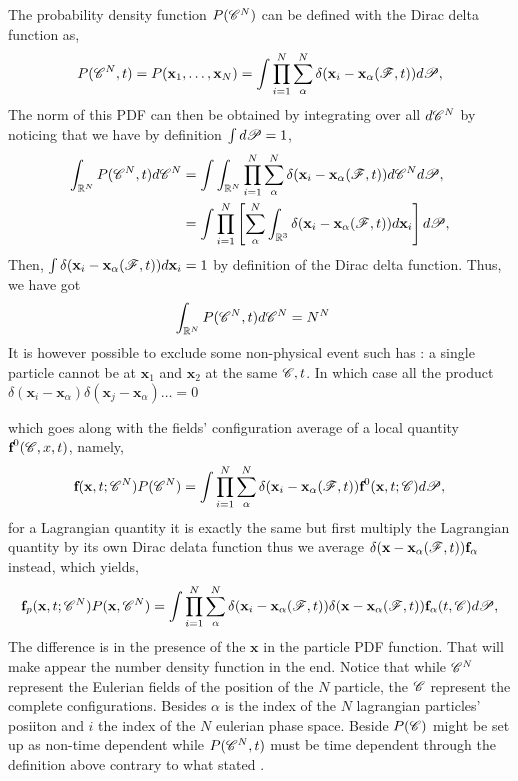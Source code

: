 The probability density function $P(\mathscr{C}^N)$ can be defined with the Dirac delta function as, 
\begin{equation*}
    P(\mathscr{C}^N,t)
    =
    P(\textbf{x}_1,\ldots,\textbf{x}_N)
    = \int 
    \prod_{i=1}^{N}\sum_{\alpha}^{N}\delta(\textbf{x}_i - \textbf{x}_\alpha(\mathscr{F},t))
    d\mathscr{P},
\end{equation*}
The norm of this PDF can then be obtained by integrating over all $d\mathscr{C}^N$ by noticing that we have by definition $\int d\mathscr{P} = 1$, 
\begin{align*}
    \int_{\mathbb{R}^N} P(\mathscr{C}^N,t) d\mathscr{C}^N
    &= 
    \int 
    \int_{\mathbb{R}^N}
    \prod_{i=1}^{N}
    \sum_{\alpha}^{N}
    \delta(\textbf{x}_i - \textbf{x}_\alpha(\mathscr{F},t))
    d\mathscr{C}^N
    d\mathscr{P},\\
    &= 
    \int 
    \prod_{i=1}^{N}\left[
    \sum_{\alpha}^{N}
    \int_{\mathbb{R}^3}
    \delta(\textbf{x}_i - \textbf{x}_\alpha(\mathscr{F},t))
    d\textbf{x}_i\right]
    d\mathscr{P},
\end{align*}
Then, $\int \delta(\textbf{x}_i - \textbf{x}_\alpha(\mathscr{F},t)) d\textbf{x}_i= 1$ by definition of the Dirac delta function. 
Thus, we have got 
\begin{align*}
    \int_{\mathbb{R}^N} P(\mathscr{C}^N,t) d\mathscr{C}^N
    &= 
    N^N
\end{align*}
It is however possible to exclude some non-physical event such has : a single particle cannot be at $\textbf{x}_1$ and $\textbf{x}_2$ at the same $\mathscr{C},t$. 
In which case all the product $\delta(\textbf{x}_i - \textbf{x}_\alpha)\delta(\textbf{x}_j - \textbf{x}_\alpha)\ldots  = 0$

which goes along with the fields' configuration average of a local quantity $\textbf{f}^0(\mathscr{C},x,t)$, namely, 
\begin{equation*}
    \textbf{f}(\textbf{x},t;\mathscr{C}^N) P(\mathscr{C}^N)
    = \int 
    \prod_{i=1}^{N}\sum_{\alpha}^{N}\delta(\textbf{x}_i - \textbf{x}_\alpha(\mathscr{F},t)) \textbf{f}^0(\textbf{x},t;\mathscr{C})
    d\mathscr{P},
\end{equation*}
for a Lagrangian quantity it is exactly the same but first multiply the Lagrangian quantity by its own Dirac delata function thus we average $\delta(\textbf{x}-\textbf{x}_\alpha(\mathscr{F},t)) \textbf{f}_\alpha$ instead, which yields, 
\begin{equation*}
    \textbf{f}_p(\textbf{x},t;\mathscr{C}^N) P(\textbf{x},\mathscr{C}^N)
    = \int 
    \prod_{i=1}^{N}\sum_{\alpha}^{N}\delta(\textbf{x}_i - \textbf{x}_\alpha(\mathscr{F},t)) 
    \delta(\textbf{x} - \textbf{x}_\alpha(\mathscr{F},t)) 
    \textbf{f}_\alpha(t,\mathscr{C})
    d\mathscr{P},
\end{equation*}
The difference is in the presence of the $\textbf{x}$ in the particle PDF function. 
That will make appear the number density function in the end. 
Notice that while $\mathscr{C}^N$ represent the Eulerian fields of the position of the $N$ particle, the $\mathscr{C}$ represent the complete configurations.
Besides $\alpha$ is the index of the $N$ lagrangian particles' posiiton and $i$ the index of the $N$ eulerian phase space.
Beside $P(\mathscr{C})$  might be set up as non-time dependent while $P(\mathscr{C}^N,t)$ must be time dependent through the definition above contrary to what stated \citet{zhang1994ensemble}. 

